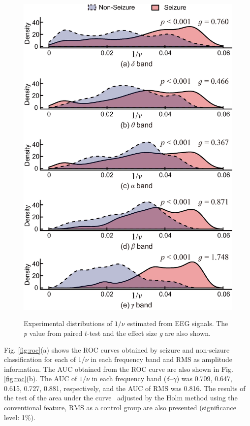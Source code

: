 \documentclass[journal]{IEEEtran}
\begin{document}
\begin{figure}[!t]　%
\centering
\includegraphics[width=1.0\hsize]{figure/dens_test_20_ver2.eps}
\caption{Experimental distributions of $1/\nu$ estimated from EEG signals. The \textit{p} value from paired $t$-test and the effect size \textit{g} are also shown. }
\label{fig:dens}
\end{figure}

Fig. \ref{fig:roc}(a) shows the ROC curves obtained by seizure and non-seizure classification for each of $1/\nu$ in each frequency band and RMS as amplitude information.
The AUC obtained from the ROC curve are also shown in Fig. \ref{fig:roc}(b).
The AUC of $1/\nu$ in each frequency band ($\delta$--$\gamma$) was 0.709, 0.647, 0.615, 0.727, 0.881, respectively, and the AUC of RMS was 0.816.
The results of the test of the area under the curve~\cite{Delong1988} adjusted by the Holm method using the conventional feature, RMS as a control group are also presented (significance level: 1\%).
\end{document}
